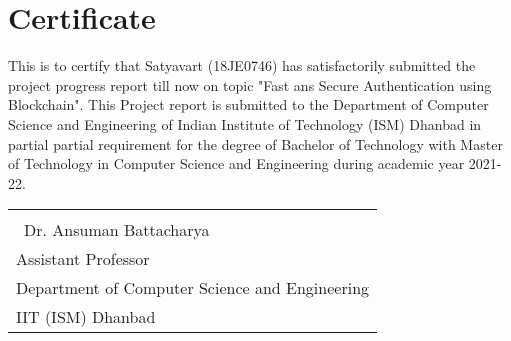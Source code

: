 \chapter*{Certificate}


    {This is to certify that Satyavart (18JE0746) has satisfactorily submitted the project
    progress report till now on topic "Fast ans Secure Authentication using Blockchain".
    This Project report is submitted to the Department of Computer Science and Engineering
    of Indian Institute of Technology (ISM) Dhanbad in partial partial requirement for the
    degree of Bachelor of Technology with Master of Technology in Computer Science
    and Engineering during academic year 2021-22.
    }
    \vspace*{8cm}

    \begin{tabular}[t]{l}
        \hline \\[0.5\baselineskip]
        {\large \ {Dr. Ansuman Battacharya}}\\[1\baselineskip]{Assistant Professor}\\{Department of Computer Science and Engineering}\\{IIT (ISM) Dhanbad}
        
    \end{tabular}
